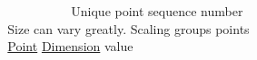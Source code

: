 ~\newline
~\newline
~\newline
~\newline
~\newline
~\newline
~\newline
~\newline
 Unique point sequence number ~\newline
~\newline
~\newline
~\newline
~\newline
~\newline
~\newline
~\newline
~\newline
~\newline
~\newline
~\newline
~\newline
~\newline
~\newline
~\newline
~\newline
~\newline
~\newline
~\newline
~\newline
 Size can vary greatly. Scaling groups points ~\newline
~\newline
~\newline
~\newline
~\newline
~\newline
~\newline
~\newline
~\newline
~\newline
~\newline
~\newline
~\newline
~\newline
~\newline
~\newline
~\newline
~\newline
~\newline
~\newline
 \mbox{\hyperlink{class_point}{Point}} \mbox{\hyperlink{class_dimension}{Dimension}} value ~\newline
